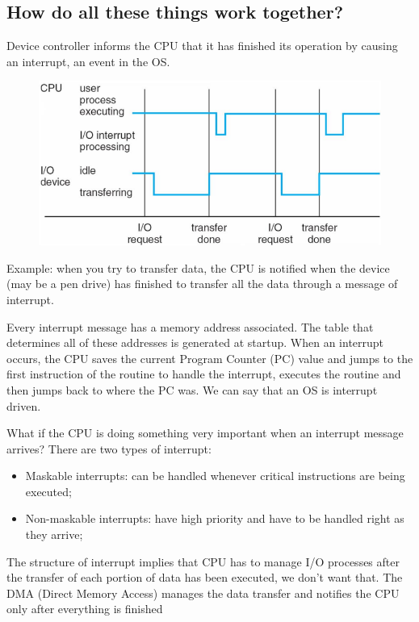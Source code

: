 \subsection{How do all these things work together?}
Device controller informs the
CPU that it has finished its
operation by causing an
interrupt, an event in the OS.

\begin{figure}[htbp]
    \centering
    \includegraphics[scale=0.45]{img/inter.png}
\end{figure}

Example: when you try to
transfer data, the CPU is
notified when the device (may
be a pen drive) has finished to
transfer all the data through a
message of interrupt.

Every interrupt message has a memory address associated. The table that determines all of these
addresses is generated at startup.
When an interrupt occurs, the CPU saves the current Program Counter (PC) value and jumps to
the first instruction of the routine to handle the interrupt, executes the routine and then jumps
back to where the PC was. We can say that an OS is interrupt driven.

What if the CPU is doing something very important when an interrupt message arrives?
There are two types of interrupt:

\begin{itemize}
    \item Maskable interrupts: can be handled whenever critical instructions are being executed;
    \item Non-maskable interrupts: have high priority and have to be handled right as they arrive;
\end{itemize}

The structure of interrupt implies that CPU has to manage I/O processes after the transfer of each
portion of data has been executed, we don’t want that.
The DMA (Direct Memory Access) manages the data transfer and notifies the CPU only after
everything is finished


